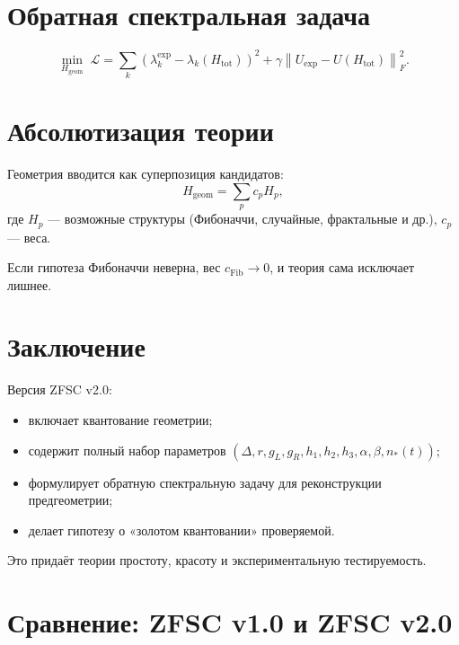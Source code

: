 \documentclass[12pt,a4paper]{article}
\begin{document}
\section{Обратная спектральная задача}
\[
\min_{H_{\mathrm{geom}}} \; \mathcal{L} =
\sum_k \left( \lambda_k^{\mathrm{exp}} - \lambda_k(H_{\mathrm{tot}}) \right)^2
+ \gamma \left\| U_{\mathrm{exp}} - U(H_{\mathrm{tot}}) \right\|_F^2.
\]

\section{Абсолютизация теории}
Геометрия вводится как суперпозиция кандидатов:
\[
H_{\mathrm{geom}} = \sum_p c_p H_p,
\]
где $H_p$ — возможные структуры (Фибоначчи, случайные, фрактальные и др.), $c_p$ — веса.  

Если гипотеза Фибоначчи неверна, вес $c_{\mathrm{Fib}} \to 0$, и теория сама исключает лишнее.

\section{Заключение}
Версия ZFSC v2.0:
\begin{itemize}
    \item включает квантование геометрии;
    \item содержит полный набор параметров $(\Delta, r, g_L, g_R, h_1,h_2,h_3, \alpha, \beta, n_*(t))$;
    \item формулирует обратную спектральную задачу для реконструкции предгеометрии;
    \item делает гипотезу о «золотом квантовании» проверяемой.
\end{itemize}

Это придаёт теории простоту, красоту и экспериментальную тестируемость.

\section{Сравнение: ZFSC v1.0 и ZFSC v2.0}
\end{document}
